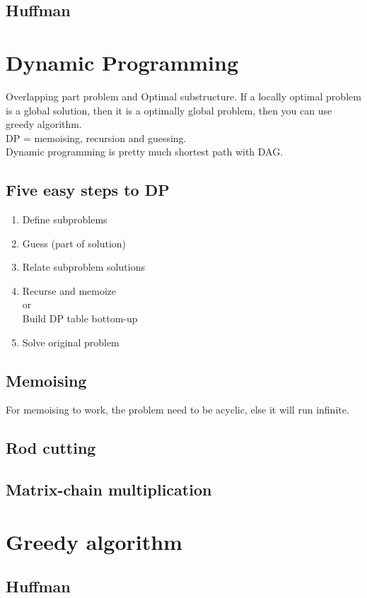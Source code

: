 \documentclass[a4paper, 10pt]{article}
\begin{document}
\begin{algorithmic}
\subsection{Huffman}

\section{Dynamic Programming}
Overlapping part problem and Optimal substructure. If a locally optimal problem is a global solution, then it is a optimally global problem, then you can use greedy algorithm.\\
DP = memoising, recursion and guessing.\\
Dynamic programming is pretty much shortest path with DAG.\\

\subsection{Five easy steps to DP}
\begin{enumerate}
	\item Define subproblems
	\item Guess (part of solution)
	\item Relate subproblem solutions
	\item Recurse and memoize\\ or\\ Build DP table bottom-up
	\item Solve original problem
\end{enumerate}

\subsection{Memoising}
For memoising to work, the problem need to be acyclic, else it will run infinite.
\subsection{Rod cutting}
\subsection{Matrix-chain multiplication}

\section{Greedy algorithm}
\subsection{Huffman}


\end{algorithmic}
\end{document}
